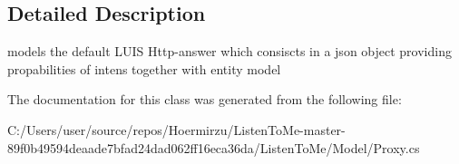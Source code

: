 \subsection{Detailed Description}
models the default L\+U\+IS Http-\/answer which consiscts in a json object providing propabilities of intens together with entity model 



The documentation for this class was generated from the following file\+:\begin{DoxyCompactItemize}
\item 
C\+:/\+Users/user/source/repos/\+Hoermirzu/\+Listen\+To\+Me-\/master-\/89f0b49594deaade7bfad24dad062ff16eca36da/\+Listen\+To\+Me/\+Model/Proxy.\+cs\end{DoxyCompactItemize}

